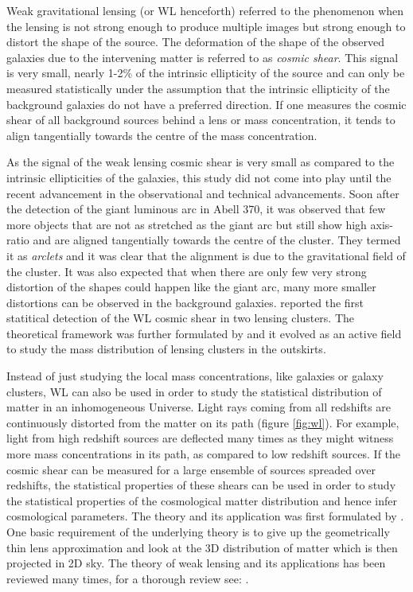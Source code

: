 Weak gravitational lensing (or WL henceforth) referred to the phenomenon when 
the lensing is not strong enough to produce multiple images but strong enough
to distort the shape of the source. The deformation of the shape of the observed galaxies
due to the intervening matter is referred to as {\it cosmic shear}. This
signal is very small, nearly 1-2$\%$ of the intrinsic ellipticity of the source 
and can only be measured statistically under the assumption that the intrinsic 
ellipticity of the background galaxies do not have a preferred direction. If one 
measures the cosmic shear of all background sources behind a lens or mass concentration,
it tends to align tangentially towards the centre of the mass concentration. 

As the signal of the weak lensing cosmic shear is very small as compared to the 
intrinsic ellipticities of the galaxies, this study did not come into play until
the recent advancement in the observational and technical advancements. Soon 
after the detection of the giant luminous arc in Abell 370, it was observed
that few more objects that are not as stretched as the giant arc but still show
high axis-ratio and are aligned tangentially towards the centre of the cluster. They
termed it as {\it arclets} and it was clear that the alignment is due to the 
gravitational field of the cluster. It was also expected that when there are
only few very strong distortion of the shapes could happen like the giant 
arc, many more smaller distortions can be observed in the background galaxies.
\cite{1990ApJ...349L...1T} reported the first statitical detection of the WL
cosmic shear in two lensing clusters. The theoretical framework was further
formulated by \cite{1993ApJ...404..441K} and it evolved as an active field
to study the mass distribution of lensing clusters in the outskirts. 

Instead of just studying the local mass concentrations, like galaxies or galaxy
clusters, WL can also be used in order to study the statistical distribution of matter
in an inhomogeneous Universe. Light rays coming from all redshifts are continuously
distorted from the matter on its path (figure \ref{fig:wl}). 
For example, light from high redshift sources
are deflected many times as they might witness more mass concentrations in its path, 
as compared to low redshift sources. If the cosmic shear can be measured for 
a large ensemble of sources spreaded over redshifts, the statistical properties
of these shears can be used in order to study the statistical properties of the
cosmological matter distribution and hence infer cosmological parameters. The 
theory and its application was first formulated by \cite{1991MNRAS.251..600B}.
One basic requirement of the underlying theory is to give up the geometrically
thin lens approximation and look at the 3D distribution of matter which 
is then projected in 2D sky. The theory of weak lensing and its applications
has been reviewed many times, for a thorough review see: \cite{}.

